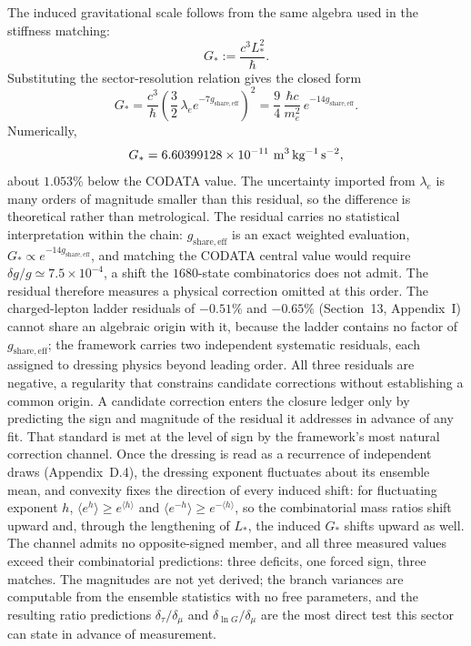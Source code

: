 \documentclass[11pt]{article}
\begin{document}
The induced gravitational scale follows from the same algebra used in the stiffness matching:
\[
G_*:=\frac{c^3L_*^2}{\hbar}.
\]
Substituting the sector-resolution relation gives the closed form
\[
\boxed{
G_*=
\frac{c^3}{\hbar}
\left(\frac32\,\lambda_e e^{-7g_{\mathrm{share,eff}}}\right)^2
=
\frac94\,\frac{\hbar c}{m_e^2}\,e^{-14g_{\mathrm{share,eff}}}
}.
\]
Numerically,
\[
G_*=6.60399128\times10^{-11}\ {\rm m^3\,kg^{-1}\,s^{-2}},
\]
about $1.053\%$ below the CODATA value. The uncertainty imported from $\lambda_e$ is many orders of magnitude smaller than this residual, so the difference is theoretical rather than metrological. The residual carries no statistical interpretation within the chain: $g_{\mathrm{share,eff}}$ is an exact weighted evaluation, $G_*\propto e^{-14g_{\mathrm{share,eff}}}$, and matching the CODATA central value would require $\delta g/g\simeq7.5\times10^{-4}$, a shift the $1680$-state combinatorics does not admit. The residual therefore measures a physical correction omitted at this order. The charged-lepton ladder residuals of $-0.51\%$ and $-0.65\%$ (Section~13, Appendix~I) cannot share an algebraic origin with it, because the ladder contains no factor of $g_{\mathrm{share,eff}}$; the framework carries two independent systematic residuals, each assigned to dressing physics beyond leading order. All three residuals are negative, a regularity that constrains candidate corrections without establishing a common origin. A candidate correction enters the closure ledger only by predicting the sign and magnitude of the residual it addresses in advance of any fit. That standard is met at the level of sign by the framework's most natural correction channel. Once the dressing is read as a recurrence of independent draws (Appendix~D.4), the dressing exponent fluctuates about its ensemble mean, and convexity fixes the direction of every induced shift: for fluctuating exponent $h$, $\langle e^{h}\rangle\ge e^{\langle h\rangle}$ and $\langle e^{-h}\rangle\ge e^{-\langle h\rangle}$, so the combinatorial mass ratios shift upward and, through the lengthening of $L_*$, the induced $G_*$ shifts upward as well. The channel admits no opposite-signed member, and all three measured values exceed their combinatorial predictions: three deficits, one forced sign, three matches. The magnitudes are not yet derived; the branch variances are computable from the ensemble statistics with no free parameters, and the resulting ratio predictions $\delta_\tau/\delta_\mu$ and $\delta_{\ln G}/\delta_\mu$ are the most direct test this sector can state in advance of measurement.
\end{document}
